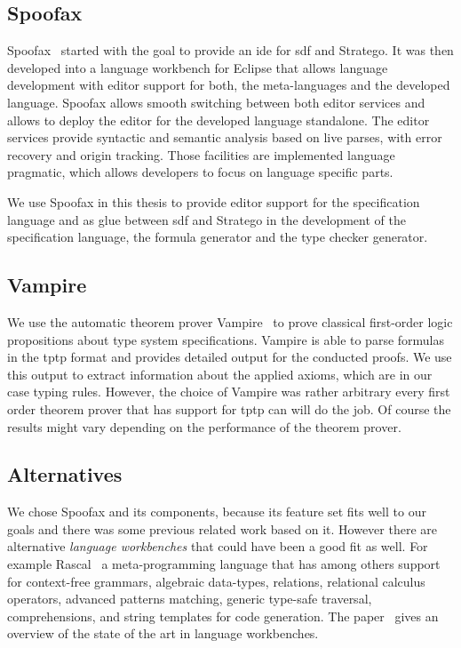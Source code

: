 \subsection{Spoofax}
Spoofax~\cite{KatsV10} started with the goal to provide an \gls{ide}
for \gls{sdf} and Stratego. It was then developed into a language
workbench for Eclipse that allows language development with editor
support for both, the meta-languages and the developed
language. Spoofax allows smooth switching between both editor services
and allows to deploy the editor for the developed language
standalone. The editor services provide syntactic and semantic
analysis based on live parses, with error recovery and origin
tracking. Those facilities are implemented language pragmatic, which
allows developers to focus on language specific parts.

We use Spoofax in this thesis to provide editor support for the
specification language and as glue between \gls{sdf} and Stratego in
the development of the specification language, the formula generator
and the type checker generator.

\subsection{Vampire}
We use the automatic theorem prover Vampire~\cite{VoronkovVampire} to
prove classical first-order logic propositions about type system
specifications. Vampire is able to parse formulas in the \gls{tptp}
format and provides detailed output for the conducted proofs. We use
this output to extract information about the applied axioms, which are
in our case typing rules. However, the choice of Vampire was rather
arbitrary every first order theorem prover that has support for
\gls{tptp} can will do the job. Of course the results might vary
depending on the performance of the theorem prover.

\subsection{Alternatives}
We chose Spoofax and its components, because its feature set fits well
to our goals and there was some previous related work based on
it. However there are alternative \emph{language workbenches} that
could have been a good fit as well. For example
Rascal~\cite{klint2009rascal} a meta-programming language that has
among others support for context-free grammars, algebraic data-types,
relations, relational calculus operators, advanced patterns matching,
generic type-safe traversal, comprehensions, and string templates for
code generation. The paper~\cite{workbenches} gives an overview of the
state of the art in language workbenches.

